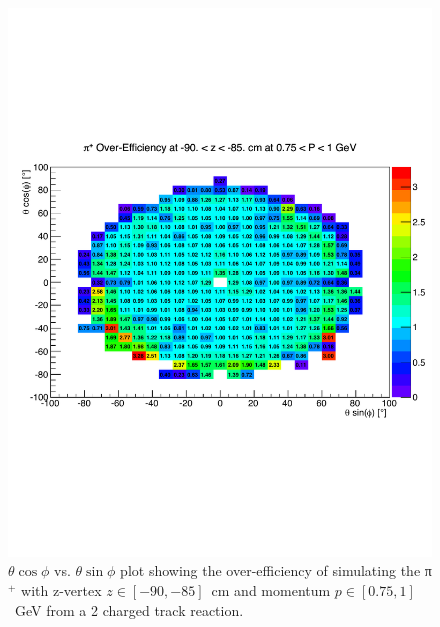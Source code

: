 \begin{v2}
\begin{figure}[htpb]\begin{center}
\includegraphics[width=1.1 \figwidth,height=\hfigheight]{figures/xsec/Pip_Eff.pdf}
\caption{\label{fig:PipEff} $\theta \cos\phi$ vs. $\theta \sin\phi$ plot showing the over-efficiency of simulating the π$^+$ with z-vertex $z \in [-90,-85]$~cm and momentum $p \in [0.75,1]$~GeV from a 2 charged track reaction.}
\end{center}\end{figure}



\end{v2}
